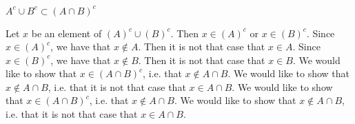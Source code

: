 \documentclass[a4paper,twoside,12pt]{article} %
\makeatletter
\DeclareRobustCommand{\_}{%
  \leavevmode\vbox{%
    \hrule\@width.4em
          \@height-.16ex
          \@depth\dimexpr.16ex+.28pt\relax}}
\makeatother
\begin{document}
{\begin{center} \large \textbf{$A^c \cup B^c \subset (A \cap B)^c $}\end{center}}\nopagebreak[4]

\begin{center}
\begin{minipage}{120mm}
Let $x$ be an element of $(A)^c\cup (B)^c$. Then $x\in (A)^c$ or $x\in (B)^c$. Since $x\in (A)^c$, we have that $x\notin A$. Then it is not that case that $x\in A$. Since $x\in (B)^c$, we have that $x\notin B$. Then it is not that case that $x\in B$. We would like to show that $x\in (A\cap B)^c$, i.e. that $x\notin A\cap B$. We would like to show that $x\notin A\cap B$, i.e. that it is not that case that $x\in A\cap B$. We would like to show that $x\in (A\cap B)^c$, i.e. that $x\notin A\cap B$. We would like to show that $x\notin A\cap B$, i.e. that it is not that case that $x\in A\cap B$.
\end{minipage}
\end{center}
\end{document}
